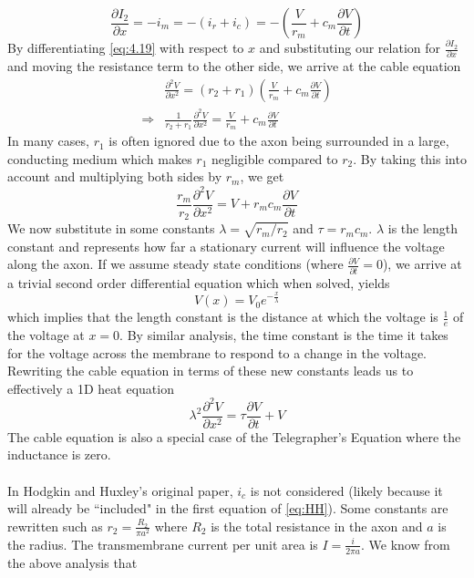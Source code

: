 \documentclass{article}
\newcommand{\pd}[2]{\frac{\partial #1}{\partial #2}}
\newcommand{\pdt}[2]{\frac{\partial ^2 #1}{\partial #2 ^2}}
\numberwithin{equation}{section}
\begin{document}
\begin{equation}
    \pd{I_2}{x} = -i_m = -(i_r+i_c) = - \left(\frac{V}{r_m} +c_m\pd{V}{t} \right)
\end{equation}
By differentiating \eqref{eq:4.19} with respect to $x$ and substituting our relation for $\pd{I_2}{x}$ and moving the resistance term to the other side, we arrive at the cable equation
\begin{equation}
\begin{split}
    &\pdt{V}{x} =(r_2+r_1) \left( \frac{V}{r_m} + c_m \pd{V}{t} \right) \\
    \Rightarrow&\frac{1}{r_2+r_1} \pdt{V}{x} = \frac{V}{r_m} +c_m \pd{V}{t}
\end{split}
\end{equation}
In many cases, $r_1$ is often ignored due to the axon being surrounded in a large, conducting medium which makes $r_1$ negligible compared to $r_2$. By taking this into account and multiplying both sides by $r_m$, we get 
\begin{equation}
    \frac{r_m}{r_2}\pdt{V}{x} = V +r_mc_m\pd{V}{t}
\end{equation}
We now substitute in some constants $\lambda = \sqrt{r_m/r_2}$ and $\tau=r_mc_m$. $\lambda$ is the length constant and represents how far a stationary current will influence the voltage along the axon. If we assume steady state conditions (where $\pd{V}{t} = 0$), we arrive at a trivial second order differential equation which when solved, yields 
\begin{equation}
    V(x) = V_0 e^{-\frac{x}{\lambda}}
\end{equation}
which implies that the length constant is the distance at which the voltage is $\frac{1}{e}$ of the voltage at $x=0$. By similar analysis, the time constant is the time it takes for the voltage across the membrane to respond to a change in the voltage. Rewriting the cable equation in terms of these new constants leads us to effectively a 1D heat equation 
\begin{equation}
    \lambda^2\pdt{V}{x} = \tau \pd{V}{t} +V
\end{equation}
The cable equation is also a special case of the Telegrapher's Equation where the inductance is zero.\\\\
In Hodgkin and Huxley's original paper, $i_c$ is not considered (likely because it will already be ``included" in the first equation of \eqref{eq:HH}). Some constants are rewritten such as $r_2 = \frac{R_2}{\pi a^2}$ where $R_2$ is the total resistance in the axon and $a$ is the radius. The transmembrane current per unit area is $I= \frac{i}{2\pi a}$. We know from the above analysis that 
\end{document}
